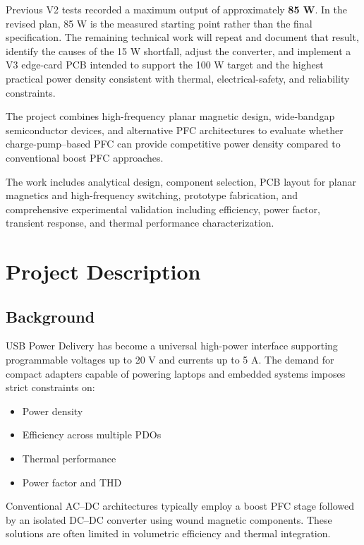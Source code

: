 \documentclass[12pt,a4paper]{report}
\begin{document}
Previous V2 tests recorded a maximum output of approximately \textbf{85 W}. In the revised plan, 85 W is the measured starting point rather than the final specification. The remaining technical work will repeat and document that result, identify the causes of the 15 W shortfall, adjust the converter, and implement a V3 edge-card PCB intended to support the 100 W target and the highest practical power density consistent with thermal, electrical-safety, and reliability constraints.

The project combines high-frequency planar magnetic design, wide-bandgap semiconductor devices, and alternative PFC architectures to evaluate whether charge-pump--based PFC can provide competitive power density compared to conventional boost PFC approaches.

The work includes analytical design, component selection, PCB layout for planar magnetics and high-frequency switching, prototype fabrication, and comprehensive experimental validation including efficiency, power factor, transient response, and thermal performance characterization.

\tableofcontents
\clearpage

\chapter{Project Description}

\section{Background}

USB Power Delivery has become a universal high-power interface supporting programmable voltages up to 20 V and currents up to 5 A. The demand for compact adapters capable of powering laptops and embedded systems imposes strict constraints on:

\begin{itemize}
    \item Power density
    \item Efficiency across multiple PDOs
    \item Thermal performance
    \item Power factor and THD
\end{itemize}

Conventional AC--DC architectures typically employ a boost PFC stage followed by an isolated DC--DC converter using wound magnetic components. These solutions are often limited in volumetric efficiency and thermal integration.
\end{document}
